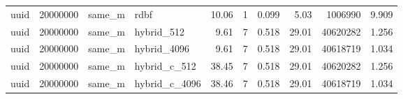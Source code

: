 \begin{tabular}{llllrrrrrr}
uuid & 20000000 & same\_m & rdbf & 10.06 & 1 & 0.099 & 5.03 & 1006990 & 9.909 \\
uuid & 20000000 & same\_m & hybrid\_512 & 9.61 & 7 & 0.518 & 29.01 & 40620282 & 1.256 \\
uuid & 20000000 & same\_m & hybrid\_4096 & 9.61 & 7 & 0.518 & 29.01 & 40618719 & 1.034 \\
uuid & 20000000 & same\_m & hybrid\_c\_512 & 38.45 & 7 & 0.518 & 29.01 & 40620282 & 1.256 \\
uuid & 20000000 & same\_m & hybrid\_c\_4096 & 38.46 & 7 & 0.518 & 29.01 & 40618719 & 1.034 \\
\bottomrule
\end{tabular}
